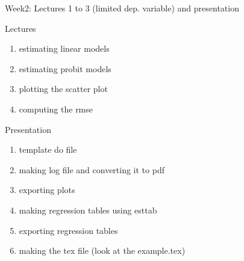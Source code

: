 \documentclass{beamer}
\begin{document}
\begin{frame}{Week2: Lectures 1 to 3 (limited dep. variable) and presentation}

Lectures
\begin{enumerate}[1.]
\item estimating linear models
\item estimating probit models
\item plotting the scatter plot
\item computing the rmse
\end{enumerate}

Presentation
\begin{enumerate}[1.]
    \item template do file
    \item making log file and converting it to pdf
    \item exporting plots
    \item making regression tables using esttab
    \item exporting regression tables
    \item making the tex file (look at the example.tex)
\end{enumerate}
    
\end{frame}
\end{document}
